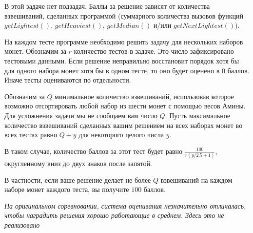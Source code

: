 В этой задаче нет подзадач. Баллы за решение зависят от количества взвешиваний, сделанных
программой (суммарного количества вызовов функций $getLightest()$, $getHeaviest()$,
$getMedian()$ и/или $getNextLightest()$).

На каждом тесте программе необходимо решить задачу для нескольких наборов монет.
Обозначим за $r$ количество тестов в задаче. Это число зафиксировано тестовыми данными.
Если решение неправильно восстановит порядок хотя бы для одного набора монет хотя бы в
одном тесте, то оно будет оценено в $0$ баллов. Иначе тесты оцениваются по отдельности.

Обозначим за $Q$ минимальное количество взвешиваний, использовав которое возможно
отсортировать любой набор из шести монет с помощью весов Амины. Для усложнения задачи
мы не сообщаем вам число $Q$. Пусть максимальное количество взвешиваний сделанных
вашим решением на всех наборах монет во всех тестах равно $Q + y$ для некоторого целого
числа $y$.


В таком случае, количество баллов за этот тест будет равно $\frac{100}{r(y / 2.5 + 1)}$, округленному вниз до двух знаков после запятой.


В частности, если ваше решение делает не более $Q$ взвешиваний на каждом наборе монет
каждого теста, вы получите $100$ баллов.

{\it На оригинальном соревновании, система оценивания незначительно отличалась, чтобы наградить решения хорошо работающие в среднем. Здесь это не реализовано }